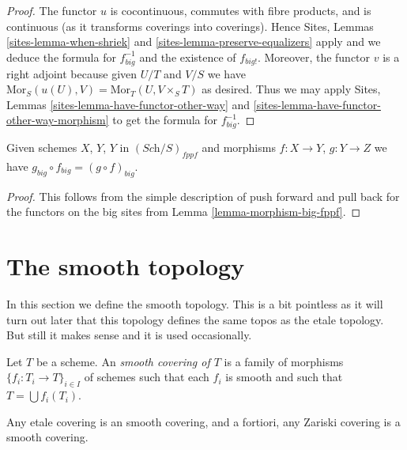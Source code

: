 \begin{proof}
The functor $u$ is cocontinuous, commutes with fibre products,
and is continuous (as it transforms coverings into coverings).
Hence Sites, Lemmas \ref{sites-lemma-when-shriek}
and \ref{sites-lemma-preserve-equalizers}
apply and we deduce the formula
for $f_{big}^{-1}$ and the existence of $f_{big!}$. Moreover,
the functor $v$ is a right adjoint because given $U/T$ and $V/S$
we have $\text{Mor}_S(u(U), V) = \text{Mor}_T(U, V\times_S T)$
as desired. Thus we may apply
Sites, Lemmas \ref{sites-lemma-have-functor-other-way} and
\ref{sites-lemma-have-functor-other-way-morphism} to get the
formula for $f_{big}^{-1}$.
\end{proof}

\begin{lemma}
\label{lemma-composition-fppf}
Given schemes $X$, $Y$, $Y$ in $(\textit{Sch}/S)_{fppf}$
and morphisms $f : X \to Y$, $g : Y \to Z$ we have
$g_{big} \circ f_{big} = (g \circ f)_{big}$.
\end{lemma}

\begin{proof}
This follows from the simple description of push forward
and pull back for the functors on the big sites from
Lemma \ref{lemma-morphism-big-fppf}.
\end{proof}















\section{The smooth topology}
\label{section-smooth}

\noindent
In this section we define the smooth topology.
This is a bit pointless as it will turn out later
that this topology defines the same topos as the
etale topology. But still it makes sense and it is used
occasionally.

\begin{definition}
\label{definition-smooth-covering}
Let $T$ be a scheme. An {\it smooth covering of $T$} is a family
of morphisms $\{f_i : T_i \to T\}_{i \in I}$ of schemes
such that each $f_i$ is smooth and such
that $T = \bigcup f_i(T_i)$.
\end{definition}

\begin{lemma}
\label{lemma-zariski-etale-smooth}
Any etale covering is an smooth covering, and a fortiori,
any Zariski covering is a smooth covering.
\end{lemma}

